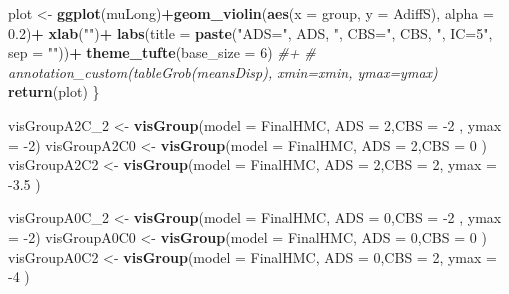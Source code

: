 \documentclass[10pt,dvipsnames,enabledeprecatedfontcommands]{scrartcl}
\newenvironment{Shaded}{\begin{snugshade}}{\end{snugshade}}
\newcommand{\KeywordTok}[1]{\textcolor[rgb]{0.13,0.29,0.53}{\textbf{#1}}}
\newcommand{\DataTypeTok}[1]{\textcolor[rgb]{0.13,0.29,0.53}{#1}}
\newcommand{\DecValTok}[1]{\textcolor[rgb]{0.00,0.00,0.81}{#1}}
\newcommand{\FloatTok}[1]{\textcolor[rgb]{0.00,0.00,0.81}{#1}}
\newcommand{\StringTok}[1]{\textcolor[rgb]{0.31,0.60,0.02}{#1}}
\newcommand{\CommentTok}[1]{\textcolor[rgb]{0.56,0.35,0.01}{\textit{#1}}}
\newcommand{\OperatorTok}[1]{\textcolor[rgb]{0.81,0.36,0.00}{\textbf{#1}}}
\newcommand{\NormalTok}[1]{#1}
\begin{document}
\begin{Shaded}
\begin{Highlighting}[]
\NormalTok{plot <-}\StringTok{ }\KeywordTok{ggplot}\NormalTok{(muLong)}\OperatorTok{+}\KeywordTok{geom_violin}\NormalTok{(}\KeywordTok{aes}\NormalTok{(}\DataTypeTok{x =}\NormalTok{ group, }\DataTypeTok{y =}\NormalTok{ AdiffS), }\DataTypeTok{alpha =} \FloatTok{0.2}\NormalTok{)}\OperatorTok{+}
\StringTok{  }\KeywordTok{xlab}\NormalTok{(}\StringTok{""}\NormalTok{)}\OperatorTok{+}
\StringTok{  }\KeywordTok{labs}\NormalTok{(}\DataTypeTok{title =} \KeywordTok{paste}\NormalTok{(}\StringTok{"ADS="}\NormalTok{, ADS, }\StringTok{", CBS="}\NormalTok{,  CBS, }\StringTok{", IC=5"}\NormalTok{, }\DataTypeTok{sep =} \StringTok{""}\NormalTok{))}\OperatorTok{+}
\StringTok{  }\KeywordTok{theme_tufte}\NormalTok{(}\DataTypeTok{base_size =} \DecValTok{6}\NormalTok{)}
\CommentTok{#+ }
\CommentTok{#  annotation_custom(tableGrob(meansDisp), xmin=xmin,  ymax=ymax)}
\KeywordTok{return}\NormalTok{(plot)}
\NormalTok{\}}

\NormalTok{visGroupA2C_}\DecValTok{2}\NormalTok{ <-}\StringTok{ }\KeywordTok{visGroup}\NormalTok{(}\DataTypeTok{model =}\NormalTok{ FinalHMC, }\DataTypeTok{ADS =} \DecValTok{2}\NormalTok{,}\DataTypeTok{CBS =} \DecValTok{-2}\NormalTok{ , }\DataTypeTok{ymax =} \DecValTok{-2}\NormalTok{)}
\NormalTok{visGroupA2C0 <-}\StringTok{ }\KeywordTok{visGroup}\NormalTok{(}\DataTypeTok{model =}\NormalTok{ FinalHMC, }\DataTypeTok{ADS =} \DecValTok{2}\NormalTok{,}\DataTypeTok{CBS =} \DecValTok{0}\NormalTok{ )}
\NormalTok{visGroupA2C2 <-}\StringTok{ }\KeywordTok{visGroup}\NormalTok{(}\DataTypeTok{model =}\NormalTok{ FinalHMC, }\DataTypeTok{ADS =} \DecValTok{2}\NormalTok{,}\DataTypeTok{CBS =} \DecValTok{2}\NormalTok{, }\DataTypeTok{ymax =} \FloatTok{-3.5}\NormalTok{ )}

\NormalTok{visGroupA0C_}\DecValTok{2}\NormalTok{ <-}\StringTok{ }\KeywordTok{visGroup}\NormalTok{(}\DataTypeTok{model =}\NormalTok{ FinalHMC, }\DataTypeTok{ADS =} \DecValTok{0}\NormalTok{,}\DataTypeTok{CBS =} \DecValTok{-2}\NormalTok{ , }\DataTypeTok{ymax =} \DecValTok{-2}\NormalTok{)}
\NormalTok{visGroupA0C0 <-}\StringTok{ }\KeywordTok{visGroup}\NormalTok{(}\DataTypeTok{model =}\NormalTok{ FinalHMC, }\DataTypeTok{ADS =} \DecValTok{0}\NormalTok{,}\DataTypeTok{CBS =} \DecValTok{0}\NormalTok{ )}
\NormalTok{visGroupA0C2 <-}\StringTok{  }\KeywordTok{visGroup}\NormalTok{(}\DataTypeTok{model =}\NormalTok{ FinalHMC, }\DataTypeTok{ADS =} \DecValTok{0}\NormalTok{,}\DataTypeTok{CBS =} \DecValTok{2}\NormalTok{, }\DataTypeTok{ymax =} \DecValTok{-4}\NormalTok{ )}


\end{Highlighting}
\end{Shaded}
\end{document}
